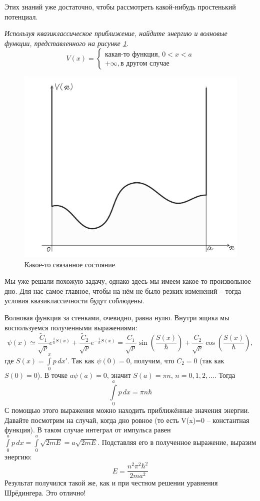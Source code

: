 Этих знаний уже достаточно, чтобы рассмотреть какой-нибудь простенький потенциал.
\begin{center}
    \textit{Используя квазиклассическое приближение, найдите энергию и волновые функции, представленного на рисунке \ref{fig 11.1}.}
    \[
    V(x) = 
    \begin{cases}
    \text{какая-то функция, } 0<x<a\\
    +\infty, \text{в другом случае}
    \end{cases}
    \]
\end{center}
\begin{figure}[ht]
\centering
\includegraphics[scale=0.2]{class_11/images/bound-state.jpg}
\caption{Какое-то связанное состояние}
\label{fig 11.1}
\end{figure}
Мы уже решали похожую задачу, однако здесь мы имеем какое-то произвольное дно. Для нас самое главное, чтобы на нём не было резких изменений -- тогда условия квазиклассичности будут соблюдены.

Волновая функция за стенками, очевидно, равна нулю. Внутри ящика мы воспользуемся полученными выражениями:
\[
\psi(x) \simeq \frac{\widetilde{C}_1}{\sqrt{p}}e^{\frac{i}{\hbar}S(x)} + \frac{\widetilde{C}_2}{\sqrt{p}}e^{-\frac{i}{\hbar}S(x)} = \frac{C_1}{\sqrt{p}}\sin (\frac{S(x)}{\hbar}) + \frac{C_2}{\sqrt{p}}\cos(\frac{S(x)}{\hbar}),
\]
где $S(x) = \int\limits_{0}^{x}p\, dx'$. Так как $\psi(0) = 0$, получим, что $C_2 = 0$ (так как $S(0) = 0$). В точке $a \psi(a) = 0$, значит $S(a) = \pi n$, $n = 0, 1, 2, ...$. Тогда
\[
\int\limits_{0}^{a}p\, dx = \pi n \hbar
\]
С помощью этого выражения можно находить приближённые значения энергии. Давайте посмотрим на случай, когда дно ровное (то есть V(x)=0 -- константная функция). В таком случае интеграл от импульса равен $\int\limits_{0}^{a}p\, dx = \int\limits_{0}^{a}\sqrt{2mE} = a\sqrt{2mE}$. Подставляя его в полученное выражение, выразим энергию:
\[
E = \frac{n^2\pi^2\hbar^2}{2ma^2}
\]
Результат получился такой же, как и при честном решении уравнения Шрёдингера. Это отлично!

